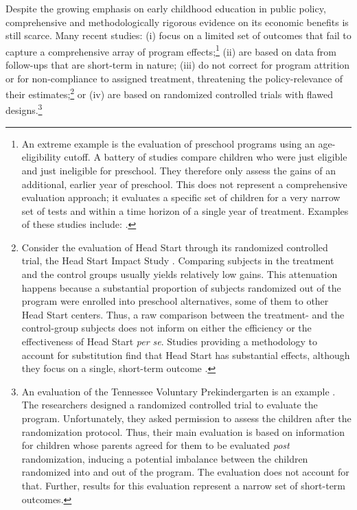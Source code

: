 \noindent Despite the growing emphasis on early childhood education in public policy, comprehensive and methodologically rigorous evidence on its economic benefits is still scarce. Many recent studies: (i) focus on a limited set of outcomes that fail to capture a comprehensive array of program effects;\footnote{An extreme example is the evaluation of preschool programs using an age-eligibility cutoff. A battery of studies compare children who were just eligible and just ineligible for preschool. They therefore only assess the gains of an additional, earlier year of preschool. This does not represent a comprehensive evaluation approach; it evaluates a specific set of children for a very narrow set of tests and within a time horizon of a single year of treatment. Examples of these studies include: \citet{Gormley_Gayer_2005_JHR,Gormley_Gayer_etal_2005_DP,Weiland_2013_CD_Impacts-of-Pre-K}.} (ii) are based on data from follow-ups that are short-term in nature; (iii) do not correct for program attrition or for non-compliance to assigned treatment, threatening the policy-relevance of their estimates;\footnote{Consider the evaluation of Head Start through its randomized controlled trial, the Head Start Impact Study \citep{Puma_Bell_etal_2010_HeadStartImpact}. Comparing subjects in the treatment and the control groups usually yields relatively low gains. This attenuation happens because a substantial proportion of subjects randomized out of the program were enrolled into preschool alternatives, some of them to other Head Start centers. Thus, a raw comparison between the treatment- and the control-group subjects does not inform on either the efficiency or the effectiveness of Head Start \emph{per se}. Studies providing a methodology to account for substitution find that Head Start has substantial effects, although they focus on a single, short-term outcome \citep{Kline-Walters_2015_NBER-Evaluating,Feller_Grindal_etal_2016_ComparedtoWhat}.} or (iv) are based on randomized controlled trials with flawed designs.\footnote{An evaluation of the Tennessee Voluntary Prekindergarten is an example \citep{Lipsey_et_al_2013_Tennessee_Kindergrtn_PRI,Lipsey_et_al_2015_Randomized_Control_Trial_PRI}. The researchers designed a randomized controlled trial to evaluate the program. Unfortunately, they asked permission to assess the children after the randomization protocol. Thus, their main evaluation is based on information for children whose parents agreed for them to be evaluated \textit{post} randomization, inducing a potential imbalance between the children randomized into and out of the program. The evaluation does not account for that. Further, results for this evaluation represent a narrow set of short-term outcomes.}\\ 

